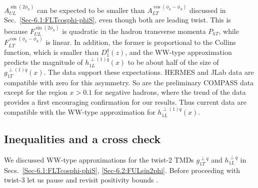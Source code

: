 \documentclass[a4paper,11pt]{article}
\begin{document}
$A_{UL}^{\sin(2\phi_h)}$  can be expected to be smaller than
$A_{LT}^{\cos(\phi_h -\phi_S)}$ discussed in Sec.~\ref{Sec-6.1:FLTcosphi-phiS},
even though both are leading twist. This is because
$F_{UL}^{\sin(2\phi_h)}$ is quadratic in the hadron transverse
momenta $P_{hT}$, while $F_{LT}^{\cos(\phi_h -\phi_S)}$ is linear.
In addition, the former is proportional to the Collins function,
which is smaller than $D_1^q(z)$, and the WW-type approximation
predicts the magnitude of $h_{1L}^{\perp(1)q}(x)$ to be about half
of the size of $g_{1T}^{\perp(1)q}(x)$.
The data support these expectations. HERMES and JLab data are compatible
with zero for this asymmetry. So are the preliminary COMPASS data except
for the region
$x>0.1$ for negative hadrons, where the trend of the data provides a first
encouraging confirmation for our results. Thus current data are compatible
with the WW-type approximation for $h_{1L}^{\perp(1)q}(x)$.


\subsection{Inequalities and a cross check}

We discussed WW-type approximations for the twist-2 TMDs
$g^{\perp q}_{1T}$ and $h^{\perp q}_{1L}$
in Secs.~\ref{Sec-6.1:FLTcosphi-phiS}, \ref{Sec-6.2:FULsin2phi}.
Before proceeding with twist-3 let us pause and revisit positivity
bounds \cite{Bacchetta:1999kz}. %
\end{document}
